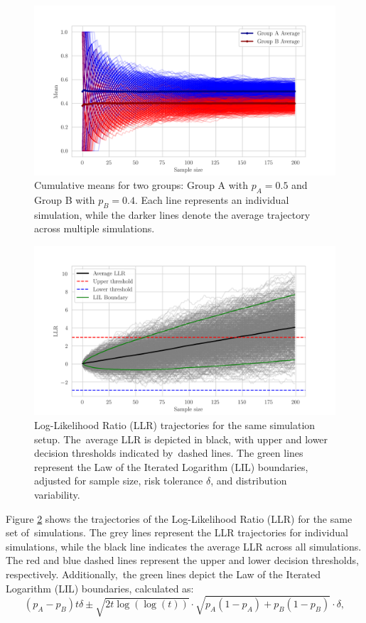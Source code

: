 \documentclass[magisterska, english]{pwr_wmat_praca_dyplomowa}
\theoremstyle{plain}
\numberwithin{theorem}{chapter}
\theoremstyle{definition}
\numberwithin{theorem}{chapter}
\begin{document}
\begin{figure}[H]
	\centering
	\includegraphics[width=\textwidth]{images/cumulative_means.png}
	\caption{Cumulative means for two groups: Group A with \( p_A = 0.5 \) and Group B with \( p_B = 0.4 \). Each line represents an individual simulation, while the darker lines denote the average trajectory across multiple simulations.}
	\label{fig:cumulative_means}
\end{figure}

\begin{figure}[H]
	\centering
	\includegraphics[width=\textwidth]{images/llr_trajectories.png}
	\caption{Log-Likelihood Ratio (LLR) trajectories for the same simulation setup. The~average LLR is depicted in black, with upper and lower decision thresholds indicated by~dashed lines. The green lines represent the Law of the Iterated Logarithm (LIL) boundaries, adjusted for sample size, risk tolerance \(\delta\), and distribution variability.}
	\label{fig:llr_trajectories}
\end{figure}

Figure \ref{fig:llr_trajectories} shows the trajectories of the Log-Likelihood Ratio (LLR) for the same set of~simulations. The grey lines represent the LLR trajectories for individual simulations, while the black line indicates the average LLR across all simulations. The red and blue dashed lines represent the upper and lower decision thresholds, respectively. Additionally,~the green lines depict the Law of the Iterated Logarithm (LIL) boundaries, calculated as:
\[
(p_A - p_B) t \delta \pm \sqrt{2t \log(\log(t))} \cdot \sqrt{p_A(1-p_A) + p_B(1-p_B)} \cdot \delta,
\]
\end{document}
